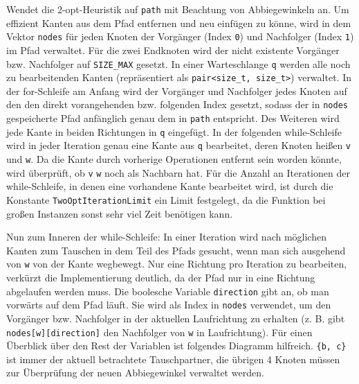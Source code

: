 \documentclass[a4paper, 10pt, ngerman]{article}
\begin{document}
\noindent Wendet die 2-opt-Heuristik auf \verb|path| mit Beachtung von Abbiegewinkeln an. Um effizient Kanten aus dem Pfad entfernen und neu einfügen zu könne, wird in dem Vektor \verb|nodes| für jeden Knoten der Vorgänger (Index \verb|0|) und Nachfolger (Index \verb|1|) im Pfad verwaltet. Für die zwei Endknoten wird der nicht existente Vorgänger bzw. Nachfolger auf \verb|SIZE_MAX| gesetzt. In einer Warteschlange \verb|q| werden alle noch zu bearbeitenden Kanten (repräsentiert als \verb|pair<size_t, size_t>|) verwaltet. In der for-Schleife am Anfang wird der Vorgänger und Nachfolger jedes Knoten auf den den direkt vorangehenden bzw. folgenden Index gesetzt, sodass der in \verb|nodes| gespeicherte Pfad anfänglich genau dem in \verb|path| entspricht. Des Weiteren wird jede Kante in beiden Richtungen in \verb|q| eingefügt. In der folgenden while-Schleife wird in jeder Iteration genau eine Kante aus \verb|q| bearbeitet, deren Knoten heißen \verb|v| und \verb|w|. Da die Kante durch vorherige Operationen entfernt sein worden könnte, wird überprüft, ob \verb|v| \verb|w| noch als Nachbarn hat. Für die Anzahl an Iterationen der while-Schleife, in denen eine vorhandene Kante bearbeitet wird, ist durch die Konstante \verb|TwoOptIterationLimit| ein Limit festgelegt, da die Funktion bei großen Instanzen sonst sehr viel Zeit benötigen kann.

Nun zum Inneren der while-Schleife: In einer Iteration wird nach möglichen Kanten zum Tauschen in dem Teil des Pfads gesucht, wenn man sich ausgehend von \verb|w| von der Kante wegbewegt. Nur eine Richtung pro Iteration zu bearbeiten, verkürzt die Implementierung deutlich, da der Pfad nur in eine Richtung abgelaufen werden muss. Die boolesche Variable \verb|direction| gibt an, ob man vorwärts auf dem Pfad läuft. Sie wird als Index in \verb|nodes| verwendet, um den Vorgänger bzw. Nachfolger in der aktuellen Laufrichtung zu erhalten (z. B. gibt \verb|nodes[w][direction]| den Nachfolger von \verb|w| in Laufrichtung). Für einen Überblick über den Rest der Variablen ist folgendes Diagramm hilfreich. \verb|{b, c}| ist immer der aktuell betrachtete Tauschpartner, die übrigen 4 Knoten müssen zur Überprüfung der neuen Abbiegewinkel verwaltet werden.
\bigskip
\end{document}
